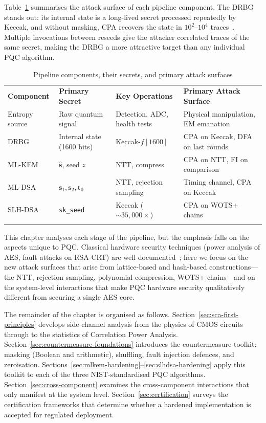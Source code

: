 Table~\ref{tab:pipeline-components} summarises the attack surface of each pipeline component.  The DRBG stands out: its internal state is a long-lived secret processed repeatedly by Keccak, and without masking, CPA recovers the state in $10^2$--$10^4$ traces~\cite{BagheriEtAl2015}.  Multiple invocations between reseeds give the attacker correlated traces of the same secret, making the DRBG a more attractive target than any individual PQC algorithm.

\begin{table}[t]
\caption{Pipeline components, their secrets, and primary attack surfaces}
\label{tab:pipeline-components}
\begin{tabular}{p{2cm}p{3cm}p{3cm}p{4cm}}
\hline\noalign{\smallskip}
\textbf{Component} & \textbf{Primary Secret} & \textbf{Key Operations} & \textbf{Primary Attack Surface} \\
\noalign{\smallskip}\svhline\noalign{\smallskip}
Entropy source & Raw quantum signal & Detection, ADC, health tests & Physical manipulation, EM emanation \\
DRBG & Internal state (1600 bits) & Keccak-$f[1600]$ & CPA on Keccak, DFA on last rounds \\
ML-KEM & $\hat{\mathbf{s}}$, seed $z$ & NTT, compress & CPA on NTT, FI on comparison \\
ML-DSA & $\mathbf{s}_1, \mathbf{s}_2, \mathbf{t}_0$ & NTT, rejection sampling & Timing channel, CPA on Keccak \\
SLH-DSA & \texttt{sk\_seed} & Keccak (${\sim}35{,}000\times$) & CPA on WOTS+ chains \\
\noalign{\smallskip}\hline
\end{tabular}
\end{table}

This chapter analyses each stage of the pipeline, but the emphasis falls on the aspects unique to PQC.  Classical hardware security techniques (power analysis of AES, fault attacks on RSA-CRT) are well-documented~\cite{MangardOswaldPopp2007}; here we focus on the new attack surfaces that arise from lattice-based and hash-based constructions---the NTT, rejection sampling, polynomial compression, WOTS+ chains---and on the system-level interactions that make PQC hardware security qualitatively different from securing a single AES core.

The remainder of the chapter is organised as follows.  Section~\ref{sec:sca-first-principles} develops side-channel analysis from the physics of CMOS circuits through to the statistics of Correlation Power Analysis.  Section~\ref{sec:countermeasure-foundations} introduces the countermeasure toolkit: masking (Boolean and arithmetic), shuffling, fault injection defences, and zeroisation.  Sections~\ref{sec:mlkem-hardening}--\ref{sec:slhdsa-hardening} apply this toolkit to each of the three NIST-standardised PQC algorithms.  Section~\ref{sec:cross-component} examines the cross-component interactions that only manifest at the system level.  Section~\ref{sec:certification} surveys the certification frameworks that determine whether a hardened implementation is accepted for regulated deployment.


